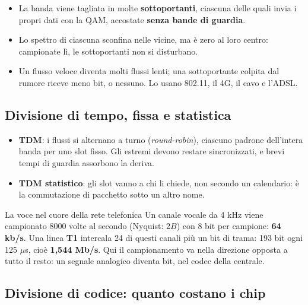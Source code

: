 \begin{itemize}
    \item La banda viene tagliata in molte \textbf{sottoportanti}, ciascuna delle quali invia i propri dati con la QAM, accostate
          \textbf{senza bande di guardia}.
    \item Lo spettro di ciascuna sconfina nelle vicine, ma è zero al loro centro: campionate lì, le sottoportanti non si disturbano.
    \item Un flusso veloce diventa molti flussi lenti; una sottoportante colpita dal rumore riceve meno bit, o nessuno. Lo usano 802.11,
          il 4G, il cavo e l'ADSL.
\end{itemize}

\subsection{Divisione di tempo, fissa e statistica}

\begin{itemize}
    \item \textbf{TDM}: i flussi si alternano a turno (\emph{round-robin}), ciascuno padrone dell'intera banda per uno slot fisso. Gli
          estremi devono restare sincronizzati, e brevi tempi di guardia assorbono la deriva.
    \item \textbf{TDM statistico}: gli slot vanno a chi li chiede, non secondo un calendario: è la commutazione di pacchetto sotto un
          altro nome.
\end{itemize}

\begin{esempio}{La voce nel cuore della rete telefonica}
Un canale vocale da 4 kHz viene campionato 8000 volte al secondo (Nyquist: $2B$) con 8 bit per campione: \textbf{64 kb/s}. Una linea
\textbf{T1} intercala 24 di questi canali più un bit di trama: 193 bit ogni 125 $\mu$s, cioè \textbf{1,544 Mb/s}. Qui il
campionamento va nella direzione opposta a tutto il resto: un segnale analogico diventa bit, nel codec della centrale.
\end{esempio}

\subsection{Divisione di codice: quanto costano i chip}

